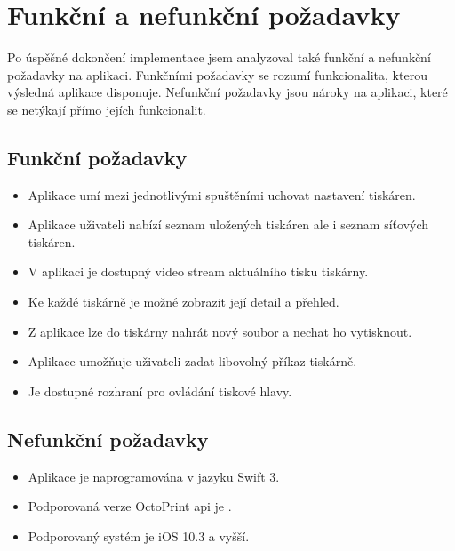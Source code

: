 \section{Funkční a nefunkční požadavky}

Po úspěšné dokončení implementace jsem analyzoval také funkční a nefunkční požadavky na aplikaci.
Funkčními požadavky se rozumí funkcionalita, kterou výsledná aplikace disponuje.
Nefunkční požadavky jsou nároky na aplikaci, které se netýkají přímo jejích funkcionalit.

\subsection{Funkční požadavky}

\begin{itemize}
    \item Aplikace umí mezi jednotlivými spuštěními uchovat nastavení tiskáren.
    \item Aplikace uživateli nabízí seznam uložených tiskáren ale i seznam síťových tiskáren.
    \item V aplikaci je dostupný video stream aktuálního tisku tiskárny.
    \item Ke každé tiskárně je možné zobrazit její detail a přehled.
    \item Z aplikace lze do tiskárny nahrát nový soubor a nechat ho vytisknout.
    \item Aplikace umožňuje uživateli zadat libovolný příkaz tiskárně.
    \item Je dostupné rozhraní pro ovládání tiskové hlavy.
\end{itemize}

\subsection{Nefunkční požadavky}

\begin{itemize}
    \item Aplikace je naprogramována v jazyku Swift 3.
    \item Podporovaná verze OctoPrint \acrshort{api} je \vapi{}.
    \item Podporovaný systém je iOS 10.3 a vyšší.
\end{itemize}